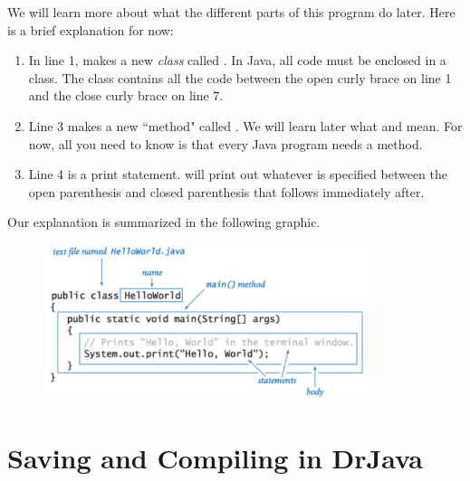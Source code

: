 We will learn more about what the different parts of this program do later. Here is a brief explanation for now:
\begin{enumerate}
\item In line 1,  makes a new \emph{class} called . In Java, all code must be enclosed in a class. The class contains all the code between the open curly brace \ic{\{} on line 1 and the close curly brace \ic{\}} on line 7.
\item Line 3 makes a new ``method" called . We will learn later what
 and  mean. For now, all you
need to know is that every Java program needs a  method.
\item Line 4 is a print statement.  will print out
whatever is specified between the open parenthesis \ic{(} and closed
parenthesis\ic{ )} that follows immediately after.
\end{enumerate}

Our explanation is summarized in the following graphic.

\begin{figure}[ht]
	\centering
	\includegraphics[width=0.85\textwidth]{images/hello.png}
	\label{fig:helloworld:example}
\end{figure}


\section{Saving and Compiling in DrJava}

